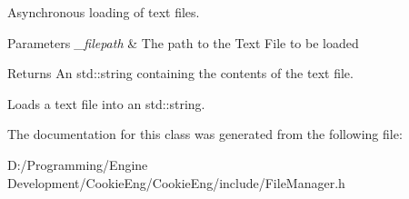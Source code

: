 Asynchronous loading of text files. 


\begin{DoxyParams}{Parameters}
{\em \+\_\+filepath} & The path to the Text File to be loaded \\
\hline
\end{DoxyParams}
\begin{DoxyReturn}{Returns}
An std\+::string containing the contents of the text file.
\end{DoxyReturn}
Loads a text file into an std\+::string. 

The documentation for this class was generated from the following file\+:\begin{DoxyCompactItemize}
\item 
D\+:/\+Programming/\+Engine Development/\+Cookie\+Eng/\+Cookie\+Eng/include/File\+Manager.\+h\end{DoxyCompactItemize}

